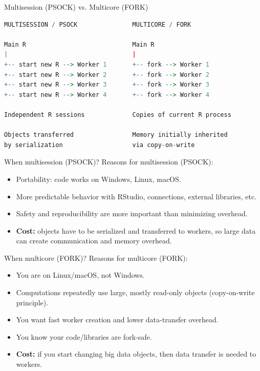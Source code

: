 \documentclass[compress,xcolor=table]{beamer}
\newcommand{\pp}{\pause}
\begin{document}
\begin{frame}[fragile]{Multisession (PSOCK) vs. Multicore (FORK)}
	\begin{lstlisting}[language=R,basicstyle=\tiny]
MULTISESSION / PSOCK               MULTICORE / FORK

Main R                             Main R
|                                  |
+-- start new R --> Worker 1       +-- fork --> Worker 1
+-- start new R --> Worker 2       +-- fork --> Worker 2
+-- start new R --> Worker 3       +-- fork --> Worker 3
+-- start new R --> Worker 4       +-- fork --> Worker 4

Independent R sessions             Copies of current R process

Objects transferred                Memory initially inherited
by serialization                   via copy-on-write
	\end{lstlisting}
\end{frame}


\begin{frame}{When multisession (PSOCK)?}
	Reasons for multisession (PSOCK):
	\begin{itemize}
		\item Portability: code works on Windows, Linux, macOS.
		\item More predictable behavior with RStudio, connections, external libraries, etc.
		\item Safety and reproducibility are more important than minimizing overhead.\pp 
		
		\item {\bf Cost:} objects have to be serialized and transferred to workers, so large data can create communication and memory overhead.
	\end{itemize}
\end{frame}

\begin{frame}{When multicore (FORK)?}
	Reasons for multicore (FORK):
	\begin{itemize}
		\item You are on Linux/macOS, not Windows.
		\item Computations repeatedly use large, mostly read-only objects (copy-on-write principle).
		\item You want fast worker creation and lower data-transfer overhead.
		\item You know your code/libraries are fork-safe.	
		\item {\bf Cost:} if you start changing big data objects, then data transfer is needed to workers. 
	\end{itemize}
\end{frame}
\end{document}
